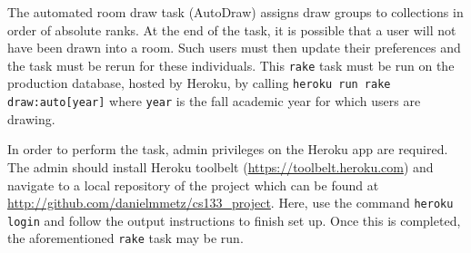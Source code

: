 The automated room draw task (AutoDraw) assigns draw groups to collections in
order of absolute ranks. At the end of the task, it is possible that a user will
not have been drawn into a room. Such users must then update their preferences
and the task must be rerun for these individuals. This \texttt{rake} task must
be run on the production database, hosted by Heroku, by calling \texttt{heroku
run rake draw:auto[year]} where \texttt{year} is the fall academic year for
which users are drawing.

In order to perform the task, admin privileges on the Heroku app are required.
The admin should install Heroku toolbelt (\url{https://toolbelt.heroku.com}) and
navigate to a local repository of the project which can be found at
\url{http://github.com/danielmmetz/cs133_project}. Here, use the command
\texttt{heroku login} and follow the output instructions to finish set up. Once
this is completed, the aforementioned \texttt{rake} task may be run.